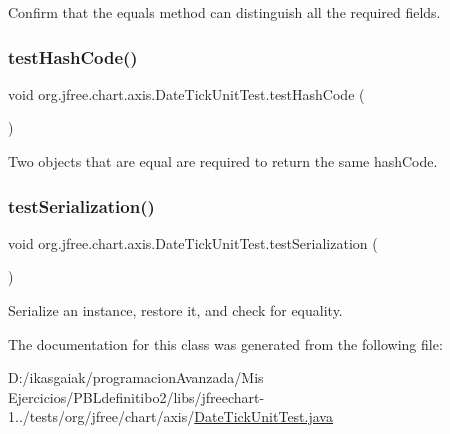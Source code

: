 Confirm that the equals method can distinguish all the required fields. \mbox{\label{classorg_1_1jfree_1_1chart_1_1axis_1_1_date_tick_unit_test_a70aa72f8867a295f1d6f5606e1721abc}} 
\subsubsection{\texorpdfstring{test\+Hash\+Code()}{testHashCode()}}
{\footnotesize\ttfamily void org.\+jfree.\+chart.\+axis.\+Date\+Tick\+Unit\+Test.\+test\+Hash\+Code (\begin{DoxyParamCaption}{ }\end{DoxyParamCaption})}

Two objects that are equal are required to return the same hash\+Code. \mbox{\label{classorg_1_1jfree_1_1chart_1_1axis_1_1_date_tick_unit_test_abaae589fe368df1d4e888e79955f4bfd}} 
\subsubsection{\texorpdfstring{test\+Serialization()}{testSerialization()}}
{\footnotesize\ttfamily void org.\+jfree.\+chart.\+axis.\+Date\+Tick\+Unit\+Test.\+test\+Serialization (\begin{DoxyParamCaption}{ }\end{DoxyParamCaption})}

Serialize an instance, restore it, and check for equality. 

The documentation for this class was generated from the following file\+:\begin{DoxyCompactItemize}
\item 
D\+:/ikasgaiak/programacion\+Avanzada/\+Mis Ejercicios/\+P\+B\+Ldefinitibo2/libs/jfreechart-\/1../tests/org/jfree/chart/axis/\mbox{\hyperlink{_date_tick_unit_test_8java}{Date\+Tick\+Unit\+Test.\+java}}\end{DoxyCompactItemize}
